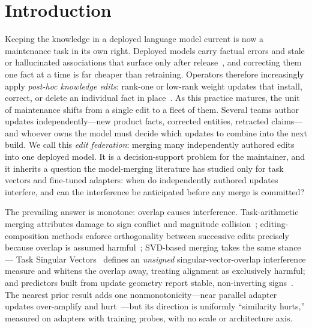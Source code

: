 \documentclass[preprint,12pt]{elsarticle}
\begin{document}
\section{Introduction}\label{sec:intro}
Keeping the knowledge in a deployed language model current is now a maintenance task in
its own right. Deployed models carry factual errors and stale or hallucinated associations
that surface only after release~\cite{hallucinationsurvey2023}, and correcting them one fact
at a time is far cheaper than retraining. Operators therefore increasingly apply
\emph{post-hoc knowledge edits}: rank-one or low-rank weight updates that install, correct,
or delete an individual fact in place~\cite{rome2022,memit2023,alphaedit2024}. As this practice matures, the unit
of maintenance shifts from a single edit to a fleet of them. Several teams author updates
independently---new product facts, corrected entities, retracted claims---and whoever owns
the model must decide which updates to combine into the next build. We call this
\emph{edit federation}: merging many independently authored edits into one deployed model.
It is a decision-support problem for the maintainer, and it inherits a question the
model-merging literature has studied only for task vectors and fine-tuned adapters: when do
independently authored updates interfere, and can the interference be anticipated
before any merge is committed?

The prevailing answer is monotone: overlap causes interference. Task-arithmetic merging
attributes damage to sign conflict and magnitude collision~\cite{ties2023,dare2023};
editing-composition methods enforce orthogonality between successive edits precisely
because overlap is assumed harmful~\cite{memitmerge2025,oedit2024,orthoedit2026a,orthoedit2026b};
SVD-based merging takes the same stance --- Task Singular Vectors~\cite{tsv2024}
defines an \emph{unsigned} singular-vector-overlap interference measure and whitens
the overlap away, treating alignment as exclusively harmful; and
predictors built from update geometry report stable, non-inverting
signs~\cite{demystify2026}. The nearest prior result adds one nonmonotonicity---near
parallel adapter updates over-amplify and hurt~\cite{mergeprobe2026}---but its direction is
uniformly ``similarity hurts,'' measured on adapters with training probes, with no scale or
architecture axis.
\end{document}
